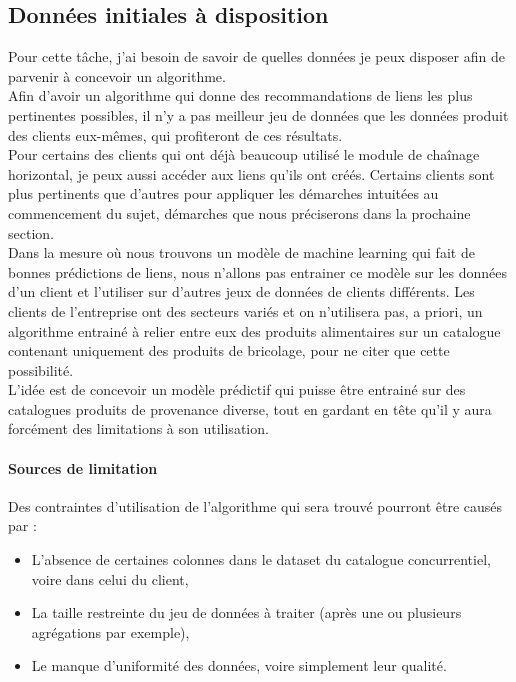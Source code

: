 \documentclass{rapportCS}
\begin{document}
\subsection{Données initiales à disposition}
Pour cette tâche, j'ai besoin de savoir de quelles données je peux disposer afin de parvenir à concevoir
un algorithme.\\
Afin d'avoir un algorithme qui donne des recommandations de liens les plus pertinentes possibles, il n'y a pas meilleur
jeu de données que les données produit des clients eux-mêmes, qui profiteront de ces résultats.\\
Pour certains des clients qui ont déjà beaucoup utilisé le module de chaînage horizontal, je peux aussi accéder aux liens
qu'ils ont créés.
Certains clients sont plus pertinents que d'autres pour appliquer les démarches intuitées au commencement du sujet,
démarches que nous préciserons dans la prochaine section.\\
Dans la mesure où nous trouvons un modèle de machine learning qui fait de bonnes prédictions de liens,
nous n'allons pas entrainer ce modèle sur les données d'un client et l'utiliser sur d'autres jeux de données de clients
différents. Les clients de l'entreprise ont des secteurs variés et on n'utilisera pas, a priori, un algorithme entrainé à relier
entre eux des produits alimentaires sur un catalogue contenant uniquement des produits de bricolage,
pour ne citer que cette possibilité. \\
L'idée est de concevoir un modèle prédictif qui puisse être entrainé sur des catalogues produits de provenance diverse,
tout en gardant en tête qu'il y aura forcément des limitations à son utilisation.\\
\paragraph{Sources de limitation} Des contraintes d'utilisation de l'algorithme qui sera trouvé pourront être causés par :\\
\begin{itemize}
  \item L'absence de certaines colonnes dans le dataset du catalogue concurrentiel, voire dans celui du client, 
  \item La taille restreinte du jeu de données à traiter (après une ou plusieurs agrégations par exemple),
  \item Le manque d'uniformité des données, voire simplement leur qualité.
\end{itemize}
\end{document}
